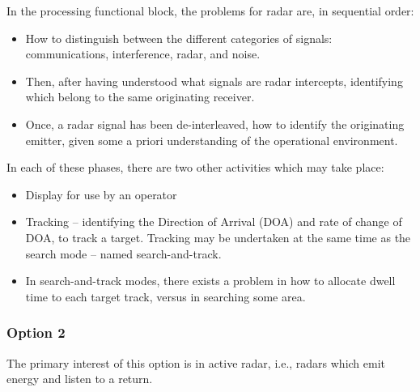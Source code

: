 In the processing functional block, the problems for radar are, in sequential order:

\begin{itemize}
    \item How to distinguish between the different categories of signals: communications, interference, radar, and noise.
    \item Then, after having understood what signals are radar intercepts, identifying which belong to the same originating receiver. 
    \item Once, a radar signal has been de-interleaved, how to identify the originating emitter, given some a priori understanding of the operational environment.
\end{itemize}

In each of these phases, there are two other activities which may take place:

\begin{itemize}
    \item Display for use by an operator
    \item Tracking – identifying the Direction of Arrival (DOA) and rate of change of DOA, to track a target. Tracking may be undertaken at the same time as the search mode – named search-and-track.
    \item In search-and-track modes, there exists a problem in how to allocate dwell time to each target track, versus in searching some area.
\end{itemize}

\subsubsection{Option 2}

The primary interest of this option is in active radar, i.e., radars which emit energy and listen to a return.

